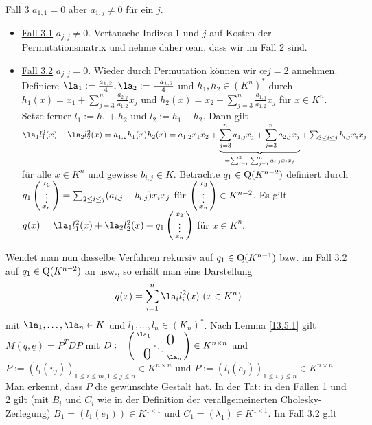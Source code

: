 \documentclass[../../main.tex]{subfiles}
\begin{document}
\begin{cproof}
\noindent\underline{Fall 3} $a_{1,1}=0$ aber $a_{1,j}\neq 0$ für ein $j$. 
\begin{itemize}
\item[ ]\underline{Fall 3.1} $a_{j,j}\neq 0$. Vertausche Indizes $1$ und $j$ auf Kosten der Permutationsmatrix und nehme daher \oe an, dass wir im Fall 2 sind.
\item[ ] \underline{Fall 3.2} $a_{j,j}=0$. Wieder durch Permutation können wir \oe $j=2$ annehmen. Definiere $\la_1:=\frac{a_{1,2}}{4}, \la_2:=\frac{-a_{1,2}}{4}$ und $h_1,h_2\in (K^n)^*$ durch $h_1(x)=x_1+\sum_{j=3}^n\frac{a_{2,j}}{a_{1,2}}x_j$ und $h_2(x)=x_2+\sum_{j=3}^n\frac{a_{1,j}}{a_{1,2}}x_j$ für $x\in K^n$. Setze ferner $l_1:=h_1+h_2$ und $l_2:=h_1-h_2$. Dann gilt $\la_1 l_1^2(x)+\la_2l_2^2(x)=a_{1,2}h_1(x)h_2(x)=a_{1,2}x_1x_2+\underbrace{\sum_{j=3}^n a_{1,j} x_j+\sum_{j=3}^n a_{2,j}x_j}_{=\sum_{i=1}^2\sum_{j=1}^n a_{i,j}x_ix_j}+\sum_{3\le i\le j}b_{i,j}x_ix_j$ für alle $x\in K^n$ und gewisse $b_{i,j}\in K$. Betrachte $q_1\in \operatorname{Q}(K^{n-2})$ definiert durch  $q_1\left(\begin{smallmatrix}x_3\\\vdots\\x_n\end{smallmatrix}\right)=\sum_{2\le i\le j} (a_{i,j}-b_{i,j})x_ix_j$ für $\left(\begin{smallmatrix}x_3\\\vdots\\x_n\end{smallmatrix}\right)\in K^{n-2}$. Es gilt $q(x)=\la_1l_1^2(x)+\la_2l_2^2(x)+q_1\cvec{x_2\\\vdots\\x_n}$ für $x\in K^n$.\\
\end{itemize}
Wendet man nun dasselbe Verfahren rekursiv auf $q_1\in \operatorname{Q}(K^{n-1})$ bzw. im Fall 3.2 auf $q_1\in \operatorname{Q}(K^{n-2})$ an usw., so erhält man eine Darstellung 
\begin{align*}
q(x)=\sum_{i=1}^n \la_il_i^2(x)\ (x\in K^n)
\end{align*}	 
mit $\la_1,\ldots ,\la_n\in K$ und $l_1,\ldots ,l_n\in (K_n)^*$. Nach Lemma \ref{13.5.1} gilt $M(q,\underline{e})=P^TDP$ mit $D:=\left(\begin{smallmatrix}
\la_1 & & \llap{$\overset{\blap{\LARGE 0}}{~}$} \\
& \ddots &\\
\rlap{\tlap{\LARGE 0}} & & \la_n\end{smallmatrix}\right)\in K^{n\times n}$ und $P:=(l_i(v_j))_{1\le i\le m, 1\le j\le n}\in K^{n\times n}$ und $P:=(l_i(e_j))_{1\le i,j\le n}\in K^{n\times n}$ Man erkennt, dass $P$ die gewünschte Gestalt hat. In der Tat: in den Fällen 1 und 2 gilt (mit $B_i$ und $C_i$ wie in der Definition der verallgemeinerten Cholesky-Zerlegung) $B_1=(l_1(e_1))\in K^{1\times 1}$ und $C_1=(\lambda_1)\in K^{1\times 1}$. Im Fall 3.2 gilt

\end{cproof}
\end{document}
